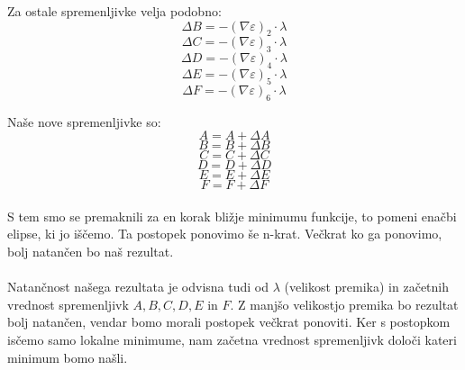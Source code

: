 \documentclass[a4paper, 12pt]{article}
\begin{document}
	Za ostale spremenljivke velja podobno:
	$$\Delta B = -(\nabla \varepsilon)_2 \cdot \lambda$$
	$$\Delta C = -(\nabla \varepsilon)_3 \cdot \lambda$$
	$$\Delta D = -(\nabla \varepsilon)_4 \cdot \lambda$$
	$$\Delta E = -(\nabla \varepsilon)_5 \cdot \lambda$$
	$$\Delta F = -(\nabla \varepsilon)_6 \cdot \lambda$$
	
	Naše nove spremenljivke so:
	$$ A = A + \Delta A$$
	$$ B = B + \Delta B$$
	$$ C = C + \Delta C$$
	$$ D = D + \Delta D$$
	$$ E = E + \Delta E$$
	$$ F = F + \Delta F$$
	
	\paragraph{}
	S tem smo se premaknili za en korak bližje minimumu funkcije, to pomeni enačbi elipse, ki jo iščemo. Ta postopek ponovimo še n-krat. Večkrat ko ga ponovimo, bolj natančen bo naš rezultat.
	 
	\paragraph{}
	Natančnost našega rezultata je odvisna tudi od $\lambda$ (velikost premika) in začetnih vrednost spremenljivk $A, B, C, D, E$ in $F$. Z manjšo velikostjo premika bo rezultat bolj natančen, vendar bomo morali postopek večkrat ponoviti. Ker s postopkom isčemo samo lokalne minimume, nam začetna vrednost spremenljivk določi kateri minimum bomo našli.
\end{document}
